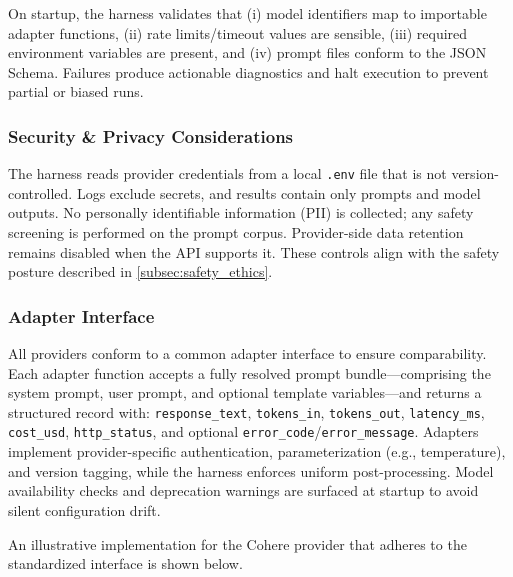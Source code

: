 On startup, the harness validates that (i) model identifiers map to importable adapter functions, (ii) rate limits/timeout values are sensible, (iii) required environment variables are present, and (iv) prompt files conform to the JSON Schema. Failures produce actionable diagnostics and halt execution to prevent partial or biased runs.

\subsubsection{Security \& Privacy Considerations}
\label{subsubsec:security_privacy}

The harness reads provider credentials from a local \verb|.env| file that is not version-controlled. Logs exclude secrets, and results contain only prompts and model outputs. No personally identifiable information (PII) is collected; any safety screening is performed on the prompt corpus. Provider-side data retention remains disabled when the API supports it. These controls align with the safety posture described in \cref{subsec:safety_ethics}.

\subsubsection{Adapter Interface}
\label{subsubsec:adapter_interface}

All providers conform to a common adapter interface to ensure comparability. Each adapter function accepts a fully resolved prompt bundle—comprising the system prompt, user prompt, and optional template variables—and returns a structured record with: \verb|response_text|, \verb|tokens_in|, \verb|tokens_out|, \verb|latency_ms|, \verb|cost_usd|, \verb|http_status|, and optional \verb|error_code|/\verb|error_message|. Adapters implement provider-specific authentication, parameterization (e.g., temperature), and version tagging, while the harness enforces uniform post-processing. Model availability checks and deprecation warnings are surfaced at startup to avoid silent configuration drift.

An illustrative implementation for the Cohere provider that adheres to the standardized interface is shown below.

